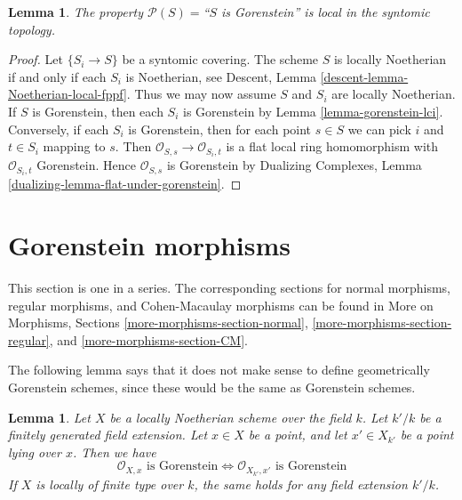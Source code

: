 \documentclass{stacks-project}
\theoremstyle{plain}
\newtheorem{lemma}[subsection]{Lemma}
\theoremstyle{definition}
\theoremstyle{remark}
\numberwithin{equation}{subsection}
\begin{document}
\begin{lemma}
\label{lemma-gorenstein-local-syntomic}
The property $\mathcal{P}(S) =$``$S$ is Gorenstein''
is local in the syntomic topology.
\end{lemma}

\begin{proof}
Let $\{S_i \to S\}$ be a syntomic covering. The scheme $S$ is locally
Noetherian if and only if each $S_i$ is Noetherian, see
Descent, Lemma \ref{descent-lemma-Noetherian-local-fppf}.
Thus we may now assume $S$ and $S_i$ are locally Noetherian.
If $S$ is Gorenstein, then
each $S_i$ is Gorenstein by Lemma \ref{lemma-gorenstein-lci}.
Conversely, if each $S_i$ is Gorenstein, then for each point
$s \in S$ we can pick $i$ and $t \in S_i$ mapping to $s$.
Then $\mathcal{O}_{S, s} \to \mathcal{O}_{S_i, t}$
is a flat local ring homomorphism with $\mathcal{O}_{S_i, t}$
Gorenstein. Hence $\mathcal{O}_{S, s}$ is Gorenstein by
Dualizing Complexes, Lemma \ref{dualizing-lemma-flat-under-gorenstein}.
\end{proof}






\section{Gorenstein morphisms}
\label{section-gorenstein-morphisms}

\noindent
This section is one in a series. The corresponding sections for
normal morphisms,
regular morphisms, and
Cohen-Macaulay morphisms
can be found in More on Morphisms, Sections
\ref{more-morphisms-section-normal},
\ref{more-morphisms-section-regular}, and
\ref{more-morphisms-section-CM}.

\medskip\noindent
The following lemma says that it does not make sense to define
geometrically Gorenstein schemes, since these would be the
same as Gorenstein schemes.

\begin{lemma}
\label{lemma-gorenstein-base-change}
Let $X$ be a locally Noetherian scheme over the field $k$.
Let $k'/k$ be a finitely generated field extension.
Let $x \in X$ be a point, and let $x' \in X_{k'}$ be a point lying
over $x$. Then we have
$$
\mathcal{O}_{X, x}\text{ is Gorenstein}
\Leftrightarrow
\mathcal{O}_{X_{k'}, x'}\text{ is Gorenstein}
$$
If $X$ is locally of finite type over $k$, the same holds for any
field extension $k'/k$.
\end{lemma}
\end{document}
